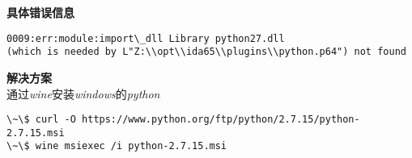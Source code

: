 \documentclass{article}
\begin{document}
\textbf{具体错误信息} \\
\begin{lstlisting}
0009:err:module:import\_dll Library python27.dll 
(which is needed by L"Z:\\opt\\ida65\\plugins\\python.p64") not found

\end{lstlisting}

\textbf{解决方案} \\
通过\textit{wine}安装\textit{windows}的\textit{python}
\begin{lstlisting}
\~\$ curl -O https://www.python.org/ftp/python/2.7.15/python-2.7.15.msi
\~\$ wine msiexec /i python-2.7.15.msi 

\end{lstlisting}
\end{document}
